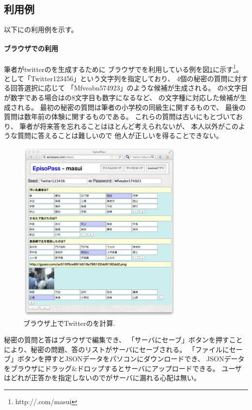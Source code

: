 \documentclass[twoside]{wiss}
\begin{document}
\subsection{{\EP}利用例}

以下に{\EP}の利用例を示す。

\paragraph{ブラウザでの利用}

筆者がtwitterの{\PW}を生成するために
ブラウザで{\EP}を利用している例を図\ref{web1}に示す\footnote{
  \textsf{http://{\EP}.com/masui}
}。
{\SS}として「\textsf{Twitter123456}」という文字列を指定しており、
4個の秘密の質問に対する回答選択に応じて
「\textsf{Mfveabn574923}」のような{\PW}候補が生成される。
{\SS}の8文字目が数字である場合は{\PW}の8文字目も数字になるなど、
{\SS}の文字種に対応した{\PW}候補が生成される。
最初の秘密の質問は筆者の小学校の同級生に関するもので、
最後の質問は数年前の体験に関するものである。
これらの質問は古い{\EM}にもとづいており、
筆者が将来答を忘れることはほとんど考えられないが、
本人以外がこのような質問に答えることは難しいので
他人が正しい{\PW}を得ることできない。

\begin{figure}[H]
\centerline{\includegraphics[width=83mm,bb=0 0 718 796]{figures/785ff09b4233804d2ec89c3af71ee5d0.png}}
\caption{ブラウザ上でTwitterの{\PW}を計算.}
\label{web1}
\end{figure}

秘密の質問と答はブラウザで編集でき、
「サーバにセーブ」ボタンを押すことにより{\SS}、秘密の問題、答のリストがサーバにセーブされる。
「ファイルにセーブ」ボタンを押すとJSONデータをパソコンにダウンロードでき、
JSONデータをブラウザにドラッグ\&ドロップするとサーバにアップロードできる。
ユーザはどれが正答かを指定しないので{\PW}がサーバに漏れる心配は無い。
\end{document}
